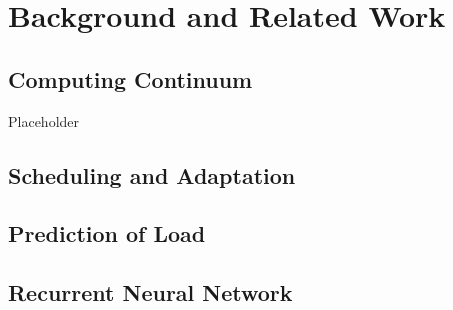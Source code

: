 \chapter{Background and Related Work}
\label{ch:background}

    \section{Computing Continuum}
    \label{sec:computing-continuum-background}

        Placeholder

    \section{Scheduling and Adaptation}
    \label{sec:scheduling-and-adaptation-background}

    \section{Prediction of Load}
    \label{sec:prediction-of-load-background}

    \section{Recurrent Neural Network}
    \label{sec:rnn-background}

